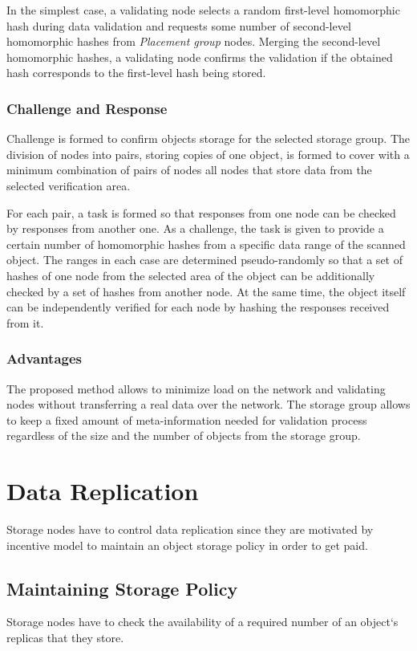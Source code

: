 \documentclass[a4paper, 11pt]{article}
\begin{document}
In the simplest case, a validating node selects a
random first-level homomorphic hash during data validation and requests some number of second-level homomorphic hashes from  \textit{Placement group} nodes. 
Merging the second-level homomorphic hashes, a validating node confirms the validation if the obtained hash corresponds to the first-level hash being stored. 

\subsubsection{Challenge and Response}

Challenge is formed to confirm objects storage for the selected storage group. The division of nodes
into pairs, storing copies of one object, is formed to cover with a minimum combination of pairs of
nodes all nodes that store data from the selected verification area.

For each pair, a task is formed so that responses from one node can be checked by responses from
another one. As a challenge, the task is given to provide a certain number of homomorphic hashes from
a specific data range of the scanned object. The ranges in each case are determined pseudo-randomly so 
that a set of hashes of one node from the selected area of the object can be additionally checked by a
set of hashes from another node. At the same time, the object itself can be independently verified for
each node by hashing the responses received from it.

\subsubsection{Advantages}
The proposed method allows to minimize load on the network and validating nodes without
transferring a real data over the network. The storage group allows to keep a fixed amount of meta-information needed for validation process regardless of the size and the number of objects from the
storage group. 

\section{Data Replication}

Storage nodes have to control data replication since they are
motivated by incentive model to maintain an object storage policy in order
to get paid.

\subsection{Maintaining Storage Policy}
Storage nodes have to check the availability of a required
number of an object`s replicas that they store.
\end{document}
